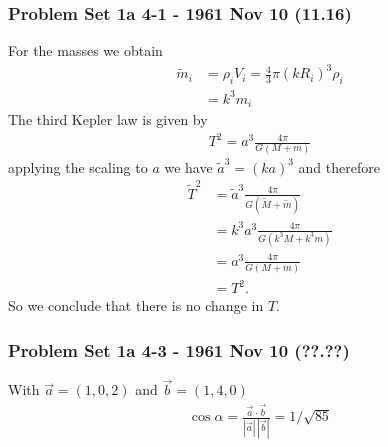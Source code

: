 \documentclass[10pt,a4paper]{book}
\theoremstyle{definition}
\begin{document}
\subsubsection{Problem Set 1a 4-1 - 1961 Nov 10 (11.16)}
For the masses we obtain
\begin{align}
\widetilde{m}_i
&=\rho_i V_i=\frac{4}{3}\pi (kR_i)^3\rho_i\\
&=k^3m_i
\end{align}
The third Kepler law is given by
\begin{align}
T^2=a^3\frac{4\pi}{G(M+m)}
\end{align}
applying the scaling to $a$ we have $\widetilde{a}^3=(ka)^3$ and therefore
\begin{align}
\widetilde{T}^2
&=\widetilde{a}^3\frac{4\pi}{G(\widetilde{M}+\widetilde{m})}\\
&=k^3a^3\frac{4\pi}{G(k^3M+k^3m)}\\
&=a^3\frac{4\pi}{G(M+m)}\\
&=T^2.
\end{align}
So we conclude that there is no change in $T$. 

\subsubsection{Problem Set 1a 4-3 - 1961 Nov 10 (??.??)}
With $\vec{a}=(1,0,2)$ and $\vec{b}=(1,4,0)$
\begin{align}
\cos\alpha=\frac{\vec{a}\cdot\vec{b}}{|\vec{a}|\,|\vec{b}|}
=1/\sqrt{85}
\end{align}
\end{document}
